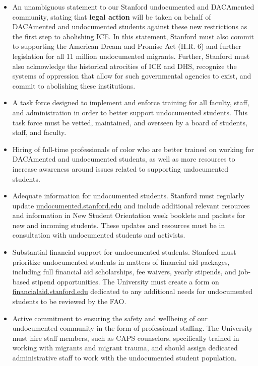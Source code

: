 \documentclass[12pt, titlepage, letterpaper]{article}
\begin{document}
\begin{itemize}
    \item An unambiguous statement to our Stanford undocumented and DACAmented community, stating that \textbf{legal action} will be taken on behalf of DACAmented and undocumented students against these new restrictions as the first step to abolishing ICE. In this statement, Stanford must also commit to supporting the American Dream and Promise Act (H.R. 6) and further legislation for all 11 million undocumented migrants. Further, Stanford must also acknowledge the historical atrocities of ICE and DHS, recognize the systems of oppression that allow for such governmental agencies to exist, and commit to abolishing these institutions. 
    \item A task force designed to implement and enforce training for all faculty, staff, and administration in order to better support undocumented students. This task force must be vetted, maintained, and overseen by a board of students, staff, and faculty.
    \item Hiring of full-time professionals of color who are better trained on working for DACAmented and undocumented students, as well as more resources to increase awareness around issues related to supporting undocumented students.
    \item Adequate information for undocumented students. Stanford must regularly update \href{https://undocumented.stanford.edu/}{undocumented.stanford.edu} and include additional relevant resources and information in New Student Orientation week booklets and packets for new and incoming students. These updates and resources must be in consultation with undocumented students and activists. 
    \item Substantial financial support for undocumented students. Stanford must prioritize undocumented students in matters of financial aid packages, including full financial aid scholarships, fee waivers, yearly stipends, and job-based stipend opportunities. The University must create a form on \href{https://financialaid.stanford.edu/}{financialaid.stanford.edu} dedicated to any additional needs for undocumented students to be reviewed by the FAO.
    \item Active commitment to ensuring the safety and wellbeing of our undocumented community in the form of professional staffing. The University must hire staff members, such as CAPS counselors, specifically trained in working with migrants and migrant trauma, and should assign dedicated administrative staff to work with the undocumented student population. 

\end{itemize}
\end{document}
